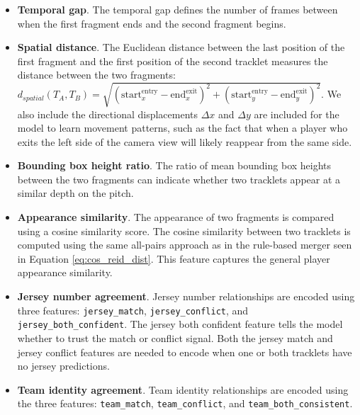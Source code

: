 \begin{itemize}
    \item \textbf{Temporal gap}. The temporal gap defines the number of frames between when the first fragment ends and the second fragment begins. 

    \item \textbf{Spatial distance}. The Euclidean distance between the last position of the first fragment and the first position of the second tracklet measures the distance between the two fragments: $d_{spatial}(T_A,T_B)=\sqrt{(\text{start}_x^\text{entry} - \text{end}_x^\text{exit})^2 + (\text{start}_y^\text{entry}-\text{end}_y^\text{exit})^2}$. We also include the directional displacements $\Delta x$ and $\Delta y$ are included for the model to learn movement patterns, such as the fact that when a player who exits the left side of the camera view will likely reappear from the same side.

    \item \textbf{Bounding box height ratio}. The ratio of mean bounding box heights between the two fragments can indicate whether two tracklets appear at a similar depth on the pitch.

    \item \textbf{Appearance similarity}. The appearance of two fragments is compared using a cosine similarity score. The cosine similarity between two tracklets is computed using the same all-pairs approach as in the rule-based merger seen in Equation \ref{eq:cos_reid_dist}. This feature captures the general player appearance similarity.

    \item \textbf{Jersey number agreement}. Jersey number relationships are encoded using three features: \texttt{jersey\_match}, \texttt{jersey\_conflict}, and \texttt{jersey\_both\_confident}. The jersey both confident feature tells the model whether to trust the match or conflict signal. Both the jersey match and jersey conflict features are needed to encode when one or both tracklets have no jersey predictions.

    \item \textbf{Team identity agreement}. Team identity relationships are encoded using the three features: \texttt{team\_match}, \texttt{team\_conflict}, and \texttt{team\_both\_consistent}.
\end{itemize}


